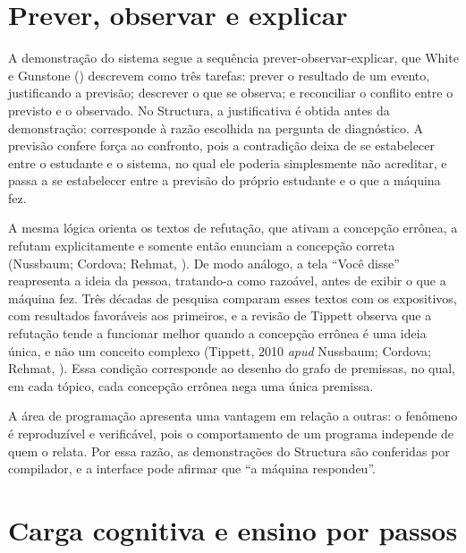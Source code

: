\section{Prever, observar e explicar}

A demonstração do sistema segue a sequência prever-observar-explicar, que White e Gunstone (\citeyear{white1992}) descrevem como três tarefas: prever o resultado de um evento, justificando a previsão; descrever o que se observa; e reconciliar o conflito entre o previsto e o observado. No Structura, a justificativa é obtida antes da demonstração: corresponde à razão escolhida na pergunta de diagnóstico. A previsão confere força ao confronto, pois a contradição deixa de se estabelecer entre o estudante e o sistema, no qual ele poderia simplesmente não acreditar, e passa a se estabelecer entre a previsão do próprio estudante e o que a máquina fez.

A mesma lógica orienta os textos de refutação, que ativam a concepção errônea, a refutam explicitamente e somente então enunciam a concepção correta (Nussbaum; Cordova; Rehmat, \citeyear{nussbaum2017}). De modo análogo, a tela ``Você disse'' reapresenta a ideia da pessoa, tratando-a como razoável, antes de exibir o que a máquina fez. Três décadas de pesquisa comparam esses textos com os expositivos, com resultados favoráveis aos primeiros, e a revisão de Tippett observa que a refutação tende a funcionar melhor quando a concepção errônea é uma ideia única, e não um conceito complexo (Tippett, 2010 \textit{apud} Nussbaum; Cordova; Rehmat, \citeyear{nussbaum2017}). Essa condição corresponde ao desenho do grafo de premissas, no qual, em cada tópico, cada concepção errônea nega uma única premissa.

A área de programação apresenta uma vantagem em relação a outras: o fenômeno é reproduzível e verificável, pois o comportamento de um programa independe de quem o relata. Por essa razão, as demonstrações do Structura são conferidas por compilador, e a interface pode afirmar que ``a máquina respondeu''.

\section{Carga cognitiva e ensino por passos}

